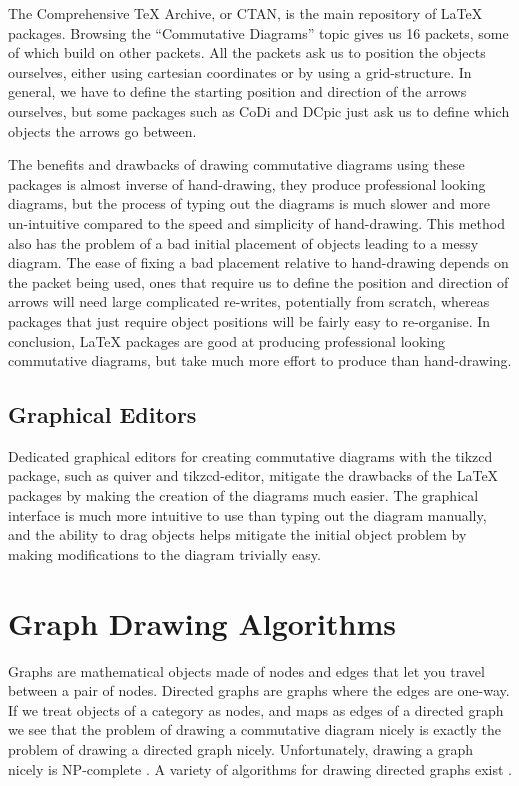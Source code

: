 \documentclass[logo,bsc,singlespacing,parskip]{infthesis}
\theoremstyle{definition}
\begin{document}
The Comprehensive \TeX{} Archive, or CTAN, is the main repository of \LaTeX{} packages. Browsing the ``Commutative Diagrams'' topic \cite{ctancommdiag} gives us 16 packets, some of which build on other packets. All the packets ask us to position the objects ourselves, either using cartesian coordinates or by using a grid-structure. %
In general, we have to define the starting position and direction of the arrows ourselves, but some packages such as CoDi %
and DCpic %
just ask us to define which objects the arrows go between.

The benefits and drawbacks of drawing commutative diagrams using these packages is almost inverse of hand-drawing, they produce professional looking diagrams, but the process of typing out the diagrams is much slower and more un-intuitive compared to the speed and simplicity of hand-drawing. This method also has the problem of a bad initial placement of objects leading to a messy diagram. The ease of fixing a bad placement relative to hand-drawing depends on the packet being used, ones that require us to define the position and direction of arrows will need large complicated re-writes, potentially from scratch, whereas packages that just require object positions will be fairly easy to re-organise. In conclusion, \LaTeX{} packages are good at producing professional looking commutative diagrams, but take much more effort to produce than hand-drawing.

\subsection{Graphical Editors}
Dedicated graphical editors for creating commutative diagrams with the tikzcd package, such as quiver %
and tikzcd-editor, %
mitigate the drawbacks of the \LaTeX{} packages by making the creation of the diagrams much easier. The graphical interface is much more intuitive to use than typing out the diagram manually, and the ability to drag objects helps mitigate the initial object problem by making modifications to the diagram trivially easy. 

\section{Graph Drawing Algorithms}\label{bkg:graph-draw}
Graphs are mathematical objects made of nodes and edges that let you travel between a pair of nodes. Directed graphs are graphs where the edges are one-way. If we treat objects of a category as nodes, and maps as edges of a directed graph we see that the problem of drawing a commutative diagram nicely is exactly the problem of drawing a directed graph nicely. Unfortunately, drawing a graph nicely is NP-complete \cite{10.1007/3-540-52698-6_1}. A variety of algorithms for drawing directed graphs exist \cite{di1994algorithms}.
\end{document}
